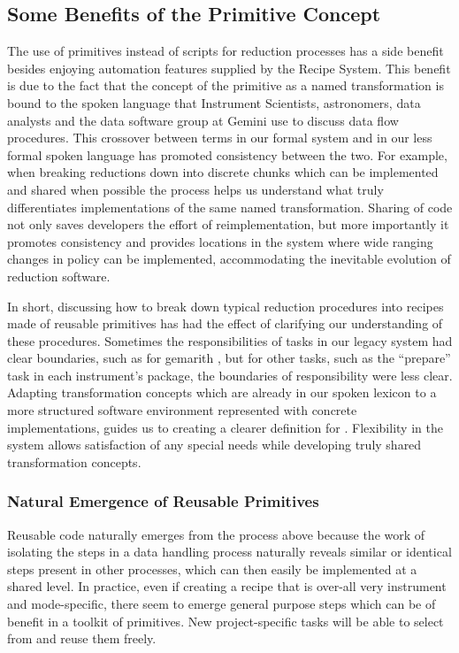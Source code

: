 \documentclass[letterpaper,10pt,english]{sphinxmanual}
\begin{document}
\subsection{Some Benefits of the Primitive Concept}
\label{gen.ADMANUAL_ADConcepts:some-benefits-of-the-primitive-concept}
The use of primitives instead of scripts for reduction processes has a
side benefit besides enjoying automation features supplied by
the Recipe System. This benefit is due to the fact that the concept of
the primitive as a named transformation is bound to the spoken
language that Instrument Scientists, astronomers, data analysts and the data
software group at Gemini use to discuss data flow procedures. This
crossover between terms in our formal system and in our less formal
spoken language has promoted consistency between the two. For example,
when breaking reductions down into discrete chunks which can be
implemented and shared when possible the process helps us understand
what truly differentiates implementations of the same named
transformation. Sharing of code not only saves developers the effort
of reimplementation, but more importantly it promotes consistency and
provides locations in the system where wide ranging changes in policy
can be implemented, accommodating the inevitable evolution of reduction
software.

In short, discussing how to break down typical reduction
procedures into recipes made of reusable primitives has had the effect
of clarifying our understanding of these procedures. Sometimes the
responsibilities of tasks in our legacy system had clear boundaries,
such as for gemarith , but for other tasks, such as the ``prepare'' task
in each instrument's package, the boundaries of responsibility were
less clear. Adapting transformation concepts which are already in
our spoken lexicon to a more structured software environment
represented with concrete implementations, guides us to creating a
clearer definition for .
Flexibility in the system allows satisfaction of any special needs
while developing truly shared transformation concepts.


\subsubsection{Natural Emergence of Reusable Primitives}
\label{gen.ADMANUAL_ADConcepts:natural-emergence-of-reusable-primitives}
Reusable code naturally emerges from the process above because the
work of isolating the steps in a data handling process naturally
reveals similar or identical steps present in other processes, which
can then easily be implemented at a shared level. In practice, even if
creating a recipe that is over-all very instrument and mode-specific,
there seem to emerge general purpose steps which can be of benefit in
a toolkit of primitives. New project-specific
tasks will be able to select from and reuse them freely.
\end{document}
